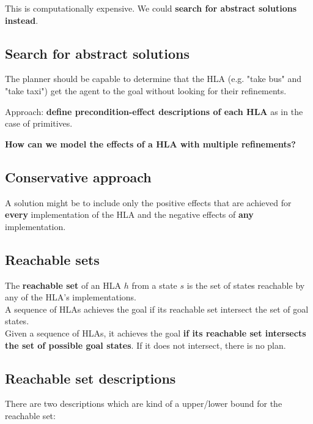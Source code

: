 \documentclass{article}
\begin{document}
This is computationally expensive. We could \textbf{search for abstract solutions instead}.

\subsection{Search for abstract solutions}

The planner should be capable to determine that the HLA (e.g. "take bus" and "take taxi") get the agent to the goal without looking for their refinements. \\

\begin{center}
    Approach: \textbf{define precondition-effect descriptions of each HLA} as in the case of primitives.
\end{center}

\textbf{How can we model the effects of a HLA with multiple refinements?}

\subsection{Conservative approach}

A solution might be to include only the positive effects that are achieved for \textbf{every} implementation of the HLA and the negative effects of \textbf{any} implementation.

\newpage

\subsection{Reachable sets}

The \textbf{reachable set} of an HLA $h$ from a state $s$ is the set of states reachable by any of the HLA's implementations. \\

A sequence of HLAs achieves the goal if its reachable set intersect the set of goal states. \\

Given a sequence of HLAs, it achieves the goal \textbf{if its reachable set intersects the set of possible goal states}. If it does not intersect, there is no plan.

\subsection{Reachable set descriptions}

There are two descriptions which are kind of a upper/lower bound for the reachable set:
\end{document}
